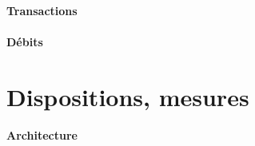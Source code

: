 \paragraph{Transactions}
\cursive{
  \itshape
  \\
  \\
  \\
  \\

  \\
  \\
  \\
  \\

  \\
  \\
  \\

  \\
  \\
  \\
}
\paragraph{Débits}
\cursive{
  \itshape
  \\
  \\
  \\
  \\

  \\
  \\
  \\
  \\

  \\
  \\
  \\

  \\
  \\
  \\
}

\section{Dispositions, mesures}
\paragraph{Architecture}
\cursive{
  \itshape
  \\
  \\
  \\
  \\

  \\
  \\
  \\
  \\

  \\
  \\
  \\

  \\
  \\
  \\
}
